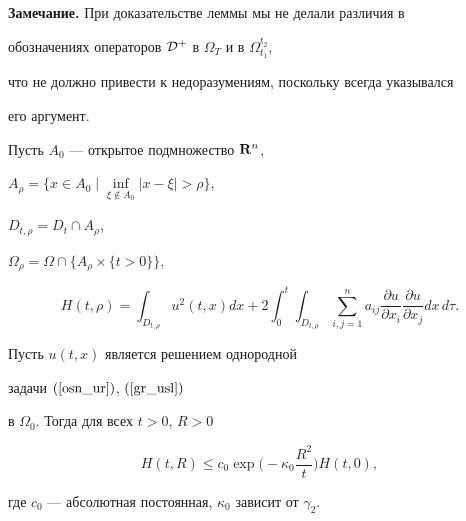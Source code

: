 


{\bf Замечание.} При доказательстве леммы мы не делали различия в


обозначениях операторов ${\cal D}^+$ в $\Omega_T$ и в $\Omega_{t_1}^{t_2}$,


что не должно привести к недоразумениям, поскольку всегда указывался


его аргумент.


\medskip


 


Пусть ${ A}_0$ --- открытое подмножество ${\bold R}^n$,


${A}_\rho =\{ x\in {A_0}\mid \inf\limits_{\xi\notin{ A}_0}|x-\xi|>\rho\}$,


$D_{t,\rho}=D_t\cap{A}_\rho$,


$\Omega_\rho= \Omega\cap\{{A}_\rho \times\{t>0\}\}$,


$$


H(t,\rho)=\int_{D_{t,\rho}}u^2(t,x)dx+


2\int_0^t \int_{D_{t,\rho}}\sum_{i,j=1}^n a_{ij}


\frac{\partial u}{\partial x_i} \frac{\partial u}{\partial x_j}dx\,d\tau. 


$$ 





\begin{lem}


Пусть $u(t,x)$ является решением однородной 


задачи $(\ref{osn_ur})$, $(\ref{gr_usl})$


в $\Omega_0$. Тогда для всех $t>0$, $R>0$


\begin{equation}


H(t,R) \leq c_0 \exp\bigg(-\kappa_0\frac{R^2}{t}\bigg)H(t,0), \label{4.9}


\end{equation} 


где $c_0$ --- абсолютная постоянная, $\kappa_0$ зависит от $\gamma_2$.


\end{lem}





